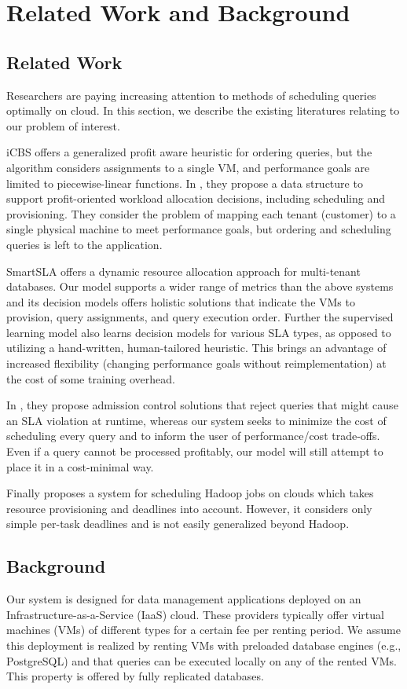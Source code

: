 \chapter{Related Work and Background}

\section{Related Work}
Researchers are paying increasing attention to methods of scheduling queries optimally on cloud. In this section, we describe the existing literatures relating to our problem of interest.

iCBS \cite{chi2011icbs} offers a generalized profit aware heuristic for ordering queries, but the algorithm considers
assignments to a single VM, and performance goals are limited to
piecewise-linear functions. In \cite{chi2011sla}, they propose a data structure to support profit-oriented workload allocation decisions, including scheduling and provisioning. They consider the problem of mapping each tenant (customer) to a single physical machine to meet performance goals, but ordering and scheduling queries is left to the application.


SmartSLA \cite{xiong2011intelligent} offers a dynamic resource allocation approach for multi-tenant databases. Our model supports a wider range of metrics than the above systems and its decision models offers holistic solutions that indicate the VMs to provision, query assignments, and query execution order. Further the supervised learning model also learns decision models for various SLA types, as opposed to utilizing a hand-written, human-tailored heuristic. This brings an advantage of increased flexibility (changing performance goals without reimplementation) at the cost of some training overhead.

In \cite{tozer2010q,xiong2011activesla}, they propose admission control solutions that reject queries that might cause an SLA violation at runtime, whereas
our system seeks to minimize the cost of scheduling every query
and to inform the user of performance/cost trade-offs. Even if a
query cannot be processed profitably, our model will still attempt
to place it in a cost-minimal way.

Finally\cite{hwang2012minimizing} proposes a system for scheduling Hadoop\cite{maryland1996hadoop} jobs on clouds which takes resource provisioning and deadlines into account. However, it considers only simple per-task deadlines and is not easily generalized beyond Hadoop.
\section{Background}
Our system is designed for data management applications deployed on an Infrastructure-as-a-Service (IaaS) cloud. These providers typically offer virtual machines (VMs) of different types for a certain fee per renting period. We assume this deployment is realized by renting VMs with preloaded database engines (e.g., PostgreSQL) and that queries can be executed locally on any of the rented VMs. This property is offered by fully replicated databases.
